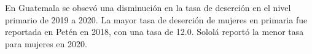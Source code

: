 En Guatemala se obsevó una disminución en la tasa de deserción en el nivel primario de 2019 a 2020. La mayor tasa de deserción de mujeres en primaria fue reportada en Petén en 2018, con una tasa de 12.0. Sololá reportó la menor tasa para mujeres en 2020. 